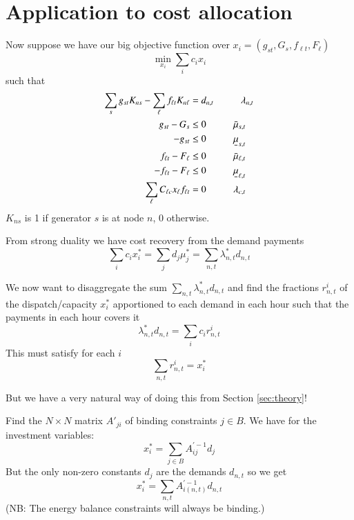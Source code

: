 \documentclass[final,3p,times]{elsarticle}
\newcommand{\ubar}[1]{\text{\b{$#1$}}}
\begin{document}
\section{Application to cost allocation}

Now suppose we have our big objective function over $x_i = (g_{st},G_s,f_{\ell t}, F_\ell)$
\begin{equation}
  \min_{ x_i} \sum_i c_i x_i
\end{equation}
such that
\begin{align}
  \sum_s g_{s t}K_{ns}-\sum_\ell f_{\ell t}K_{n\ell}  & =  d_{n,t}  \hspace{1cm} \lambda_{n,t} \\
  g_{s t} - G_s & \leq 0  \hspace{1cm} \bar{\mu}_{s,t} \\
  -g_{s t} & \leq 0  \hspace{1cm} \ubar{\mu}_{s,t} \\
  f_{\ell t} - F_\ell & \leq 0  \hspace{1cm} \bar{\mu}_{\ell,t} \\
  -f_{\ell t} - F_\ell & \leq 0  \hspace{1cm} \ubar{\mu}_{\ell,t} \\
  \sum_\ell C_{\ell c}x_\ell f_{\ell t} & = 0 \hspace{1cm} \lambda_{c,t}
\end{align}
$K_{ns}$ is 1 if generator $s$ is at node $n$, 0 otherwise.


From strong duality we have cost recovery from the demand payments
\begin{equation}
  \sum_i c_i x^*_i = \sum_j d_j \mu^*_j = \sum_{n,t} \lambda_{n,t}^* d_{n,t}
\end{equation}

We now want to disaggregate the sum $ \sum_{n,t} \lambda_{n,t}^* d_{n,t}$ and find the fractions $r^i_{n,t}$ of the dispatch/capacity $x^*_i$ apportioned to each demand in each hour such that the payments in each hour covers it
\begin{equation}
  \lambda_{n,t}^* d_{n,t} = \sum_i  c_i r^i_{n,t}
\end{equation}
This must satisfy for each $i$
\begin{equation}
  \sum_{n,t} r^i_{n,t}  = x^*_i
\end{equation}

But we have a very natural way of doing this from Section \ref{sec:theory}!

Find the $N\times N$ matrix $A'_{ji}$ of binding constraints $j\in B$. We have for the investment variables:
\begin{equation}
x^*_i = \sum_{j\in B} A^{\prime -1}_{ij} d_j
\end{equation}
But the only non-zero constants $d_j$ are the demands $d_{n,t}$ so we get
\begin{equation}
x^*_i = \sum_{n,t} A^{\prime -1}_{i(n,t)} d_{n,t}
\end{equation}
(NB: The energy balance constraints will always be binding.)
\end{document}
